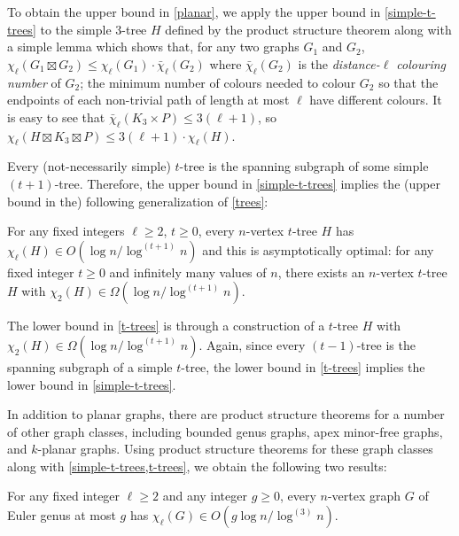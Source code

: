 \documentclass[kpfonts]{patmorin}
\newcommand{\trn}{\chi_2}
\newcommand{\lrn}{\chi_{\ell}}
\newcommand{\dlcn}{\bar{\chi}_\ell}
\theoremstyle{named}
\begin{document}
To obtain the upper bound in \cref{planar}, we apply the upper bound in \cref{simple-t-trees} to the simple 3-tree $H$ defined by the product structure theorem along with a simple lemma which shows that, for any two graphs $G_1$ and $G_2$, $\lrn(G_1\boxtimes G_2)\le \lrn(G_1)\cdot\dlcn(G_2)$ where $\dlcn(G_2)$ is the \emph{distance-$\ell$ colouring number} of $G_2$;  the minimum number of colours needed to colour $G_2$ so that the endpoints of each non-trivial path of length at most $\ell$ have different colours.  It is easy to see that $\dlcn(K_3\times P)\le 3(\ell+1)$, so $\lrn(H\boxtimes K_3\boxtimes P)\le 3(\ell+1)\cdot\lrn(H)$.

Every (not-necessarily simple) $t$-tree is the spanning subgraph of some simple $(t+1)$-tree. Therefore, the upper bound in \cref{simple-t-trees} implies the (upper bound in the) following generalization of \cref{trees}:

\begin{thm}\label{t-trees}
    For any fixed integers $\ell\ge 2$, $t\ge 0$, every $n$-vertex $t$-tree $H$ has $\lrn(H) \in O(\log n/\log^{(t+1)} n)$ and this is asymptotically optimal: for any fixed integer $t\ge 0$ and infinitely many values of $n$, there exists an $n$-vertex $t$-tree $H$ with $\trn(H)\in\Omega(\log n/\log^{(t+1)} n)$.
\end{thm}

The lower bound in \cref{t-trees} is through a construction of a $t$-tree $H$ with $\trn(H)\in\Omega(\log n/\log^{(t+1)} n)$.  Again, since every $(t-1)$-tree is the spanning subgraph of a simple $t$-tree, the lower bound in \cref{t-trees} implies the lower bound in \cref{simple-t-trees}.

In addition to planar graphs, there are product structure theorems for a number of other graph classes, including bounded genus graphs, apex minor-free graphs, and $k$-planar graphs.  Using product structure theorems for these graph classes along with \cref{simple-t-trees,t-trees}, we obtain the following two results:

\begin{thm}\label{bounded-genus}
    For any fixed integer $\ell\ge 2$ and any integer $g\ge 0$, every $n$-vertex graph $G$ of Euler genus at most $g$ has $\lrn(G)\in O(g\log n/\log^{(3)} n)$.
\end{thm}
\end{document}
